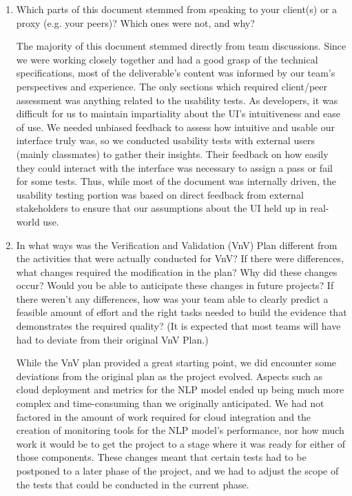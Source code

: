\documentclass[12pt, titlepage]{article}
\begin{document}
\begin{enumerate}
  \item Which parts of this document stemmed from speaking to your client(s) or
  a proxy (e.g. your peers)? Which ones were not, and why?

  The majority of this document stemmed directly from team discussions. 
  Since we were working closely together and had a good grasp of the 
  technical specifications, most of the deliverable's content was informed 
  by our team's perspectives and experience. The only sections which required 
  client/peer assessment was anything related to the usability tests. As developers, 
  it was difficult for us to maintain impartiality about the UI's intuitiveness and 
  ease of use. We needed unbiased feedback to assess how intuitive and usable our 
  interface truly was, so we conducted usability tests with external users 
  (mainly classmates) to gather their insights. Their feedback on how easily they 
  could interact with the interface was necessary to assign a pass or fail for some tests. 
  Thus, while most of the document was internally driven, the usability testing portion 
  was based on direct feedback from external stakeholders to ensure that our assumptions 
  about the UI held up in real-world use.

  \item In what ways was the Verification and Validation (VnV) Plan different
  from the activities that were actually conducted for VnV?  If there were
  differences, what changes required the modification in the plan?  Why did
  these changes occur?  Would you be able to anticipate these changes in future
  projects?  If there weren't any differences, how was your team able to clearly
  predict a feasible amount of effort and the right tasks needed to build the
  evidence that demonstrates the required quality?  (It is expected that most
  teams will have had to deviate from their original VnV Plan.)

While the VnV plan provided a great starting point, we did encounter some 
deviations from the original plan as the project evolved. Aspects such as cloud 
deployment and metrics for the NLP model ended up being much more complex and 
time-consuming than we originally anticipated. We had not factored in the 
amount of work required for cloud integration and the creation of monitoring 
tools for the NLP model's performance, nor how much work it would be to get 
the project to a stage where it was ready for either of those components. These changes 
meant that certain tests had to be postponed to a later phase of the project, and we had to 
adjust the scope of the tests that could be conducted in the current phase.


\end{enumerate}
\end{document}
